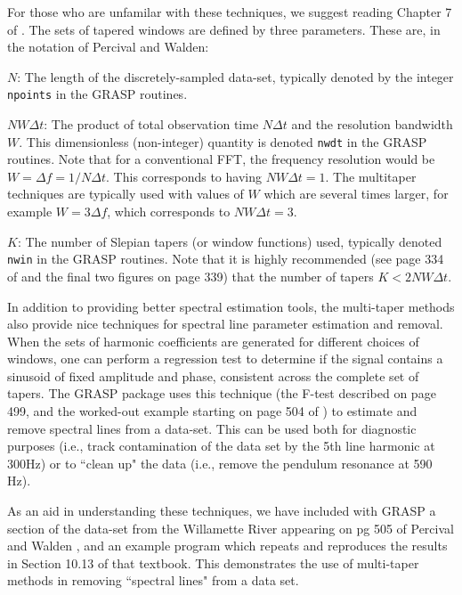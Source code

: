 For those who are unfamilar with these techniques, we suggest reading Chapter
7 of \cite{percivalwalden}.  The sets of tapered windows are defined by
three parameters.  These are, in the notation of Percival and Walden:
\begin{description}
\item{$N$:} The length of the discretely-sampled data-set, typically
denoted by the integer {\tt npoints} in the GRASP routines.
\item{$NW \Delta t$:} The product of total observation time $N \Delta
t$ and the resolution bandwidth $W$.  This dimensionless (non-integer)
quantity is denoted {\tt nwdt} in the GRASP routines.  Note that for a
conventional FFT, the frequency resolution would be $W=\Delta f = 1/N
\Delta t$.  This corresponds to having $NW \Delta t = 1$.  The multitaper
techniques are typically used with values of $W$ which are several times
larger, for example $W = 3 \Delta f$, which corresponds to $NW \Delta
t = 3$.
\item{$K$:} The number of Slepian tapers (or window functions) used,
typically denoted {\tt nwin} in the GRASP routines.  Note that it is
highly recommended (see page 334 of \cite{percivalwalden} and the final
two figures on page 339) that the number of tapers $K< 2NW \Delta t$.
\end{description}

In addition to providing better spectral estimation tools, the multi-taper
methods also provide nice techniques for spectral line parameter
estimation and removal.  When the sets of harmonic coefficients are
generated for different choices of windows, one can perform a regression
test to determine if the signal contains a sinusoid of fixed amplitude
and phase, consistent across the complete set of tapers.  The GRASP
package uses this technique (the F-test described on page 499, and the worked-out
example starting on page 504 of
\cite{percivalwalden}) to estimate and remove spectral lines from a
data-set.  This can be used both for diagnostic purposes (i.e., track
contamination of the data set by the 5th line harmonic at 300Hz) or to
``clean up" the data (i.e., remove the pendulum resonance at 590 Hz).

As an aid in understanding these techniques, we have included with GRASP a
section of the data-set from the Willamette River appearing on pg 505 of
Percival and Walden \cite{percivalwalden}, and an example program which
repeats and reproduces the results in Section 10.13 of that textbook.
This demonstrates the use of multi-taper methods in removing ``spectral
lines" from a data set.
\clearpage

